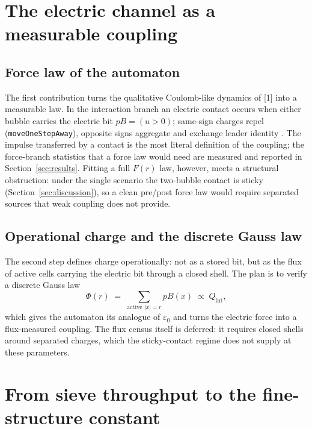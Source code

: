 \documentclass[11pt,a4paper]{article}
\begin{document}
\section{The electric channel as a measurable coupling}
\label{sec:contrib1}

\subsection{Force law of the automaton}
\label{sec:forcelaw}

The first contribution turns the qualitative Coulomb-like dynamics of [1] into
a measurable law. In the interaction branch an electric contact occurs when
either bubble carries the electric bit $pB=(u>0)$; same-sign charges repel
(\texttt{moveOneStepAway}), opposite signs aggregate and exchange leader
identity \cite{itfrombit}. The impulse transferred by a contact is the most
literal definition of the coupling; the force-branch statistics that a force
law would need are measured and reported in Section~\ref{sec:results}.
Fitting a full $F(r)$ law, however, meets a structural obstruction: under the
single scenario the two-bubble contact is sticky (Section~\ref{sec:discussion}),
so a clean pre/post force law would require separated sources that weak
coupling does not provide.

\subsection{Operational charge and the discrete Gauss law}
\label{sec:gauss}

The second step defines charge operationally: not as a stored bit, but as the
flux of active cells carrying the electric bit through a closed shell. The
plan is to verify a discrete Gauss law
\begin{equation}
  \Phi(r) \;=\; \sum_{\text{active }|x|=r} pB(x) \;\propto\; Q_{\mathrm{int}},
  \label{eq:gauss}
\end{equation}
which gives the automaton its analogue of $\varepsilon_0$ and turns the
electric force into a flux-measured coupling. The flux census itself is
deferred: it requires closed shells around separated charges, which the
sticky-contact regime does not supply at these parameters.

\section{From sieve throughput to the fine-structure constant}
\label{sec:contrib2}
\end{document}
